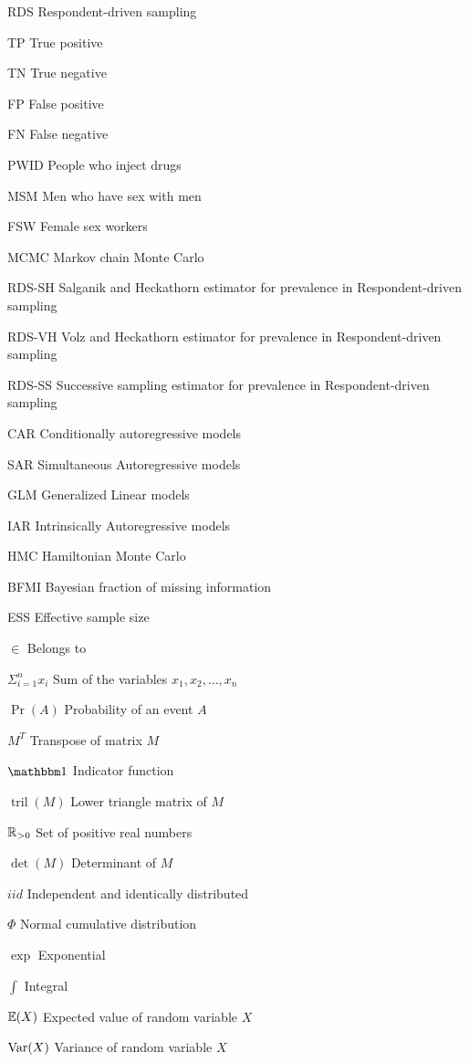 \begin{siglas}
    \item[RDS] Respondent-driven sampling
    \item[TP] True positive 
    \item[TN] True negative
    \item[FP] False positive
    \item[FN] False negative
    \item[PWID] People who inject drugs
    \item[MSM] Men who have sex with men
    \item[FSW] Female sex workers      
    \item[MCMC] Markov chain Monte Carlo 
    \item[RDS-SH] Salganik and Heckathorn estimator for prevalence in
    Respondent-driven sampling 
    \item[RDS-VH] Volz and Heckathorn estimator for prevalence in
    Respondent-driven sampling
    \item[RDS-SS] Successive sampling estimator for prevalence in
    Respondent-driven sampling 
    \item[CAR] Conditionally autoregressive models
    \item[SAR] Simultaneous Autoregressive models
    \item[GLM] Generalized Linear models  
    \item[IAR] Intrinsically Autoregressive models
    \item[HMC] Hamiltonian Monte Carlo
    \item[BFMI] Bayesian fraction of missing information  
    \item[ESS] Effective sample size 
  \end{siglas}
  
  \begin{simbolos}
    \item[$\in$] Belongs to 
    \item[$\Sigma_{i=1}^n x_i$] Sum of the variables $x_1, x_2, \dots, x_n$
    \item[$\Pr(A)$] Probability of an event $A$
    \item[$M^T$] Transpose of matrix $M$
    \item[$\ind$] Indicator function 
    \item[$\operatorname{tril}(M)$] Lower triangle matrix of $M$
    \item[$\mathbb{R}_{>0}$] Set of positive real numbers
    \item[$\det(M)$] Determinant of $M$ 
    \item[$iid$] Independent and identically distributed
    \item[$\Phi$] Normal cumulative distribution
    \item[$\exp$] Exponential  
    \item[$\int$] Integral 
    \item[$\mathbb{E}(X)$] Expected value of random variable $X$ 
    \item[$\operatorname{Var}(X)$] Variance of random variable $X$
  \end{simbolos}